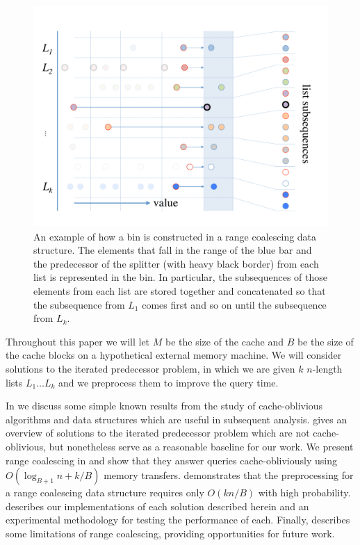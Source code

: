 \begin{figure}[h]
\includegraphics[scale=.33333]{cache-oblivious-fractional-cascading-c.pdf}
\caption{An example of how a bin is constructed in a range coalescing data
structure.  The elements that fall in the range of the blue bar and the predecessor
of the splitter (with heavy black border) from each list is represented in the bin.
In particular, the subsequences of those elements from each list are stored together
and concatenated so that the subsequence from $L_1$ comes first and so on until the
subsequence from $L_k$.}
\label{fig:coalesced_bin} 
\end{figure}

Throughout this paper we will let $M$ be the size of the cache and $B$ be the size
of the cache blocks
on a hypothetical external memory machine.  We will consider solutions to the iterated
predecessor problem, in which we are given $k$ $n$-length lists $L_1 \ldots L_k$ and
we preprocess them to improve the query time.

In  we discuss some simple known results from the study of
cache-oblivious algorithms and data structures which are useful in subsequent analysis.
 gives an overview of solutions to the iterated predecessor problem
which are not cache-oblivious, but nonetheless serve as a reasonable baseline for
our work.  We present range coalescing in  and show that they
answer queries cache-obliviously using $O(\log_{B+1} n + k/B)$ memory transfers.
 demonstrates that the preprocessing for a range coalescing
data structure requires only $O(kn/B)$ with high probability.   
describes our implementations of each solution described herein and an experimental
methodology for testing the performance of each.  Finally,  
describes some limitations of range coalescing, providing opportunities for future
work.

